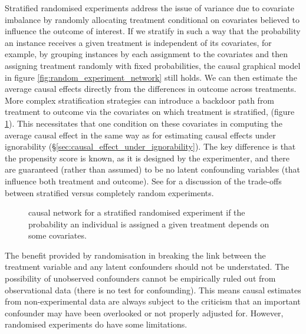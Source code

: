 \documentclass[11pt,a4paper,twoside]{report}
\theoremstyle{plain}
\theoremstyle{definition}
\begin{document}
Stratified randomised experiments address the issue of variance due to covariate imbalance by randomly allocating treatment conditional on covariates believed to influence the outcome of interest. If we stratify in such a way that the probability an instance receives a given treatment is independent of its covariates, for example, by grouping instances by each assignment to the covariates and then assigning treatment randomly with fixed probabilities, the causal graphical model in figure \ref{fig:random_experiment_network} still holds. We can then estimate the average causal effects directly from the differences in outcome across treatments. More complex stratification strategies can introduce a backdoor path from treatment to outcome via the covariates on which treatment is stratified, (figure \ref{fig:random_experiment_network_stratified}). This necessitates that one condition on these covariates in computing the average causal effect in the same way as for estimating causal effects under ignorability (\S\ref{sec:causal_effect_under_ignorability}). The key difference is that the propensity score is known, as it is designed by the experimenter, and there are guaranteed (rather than assumed) to be no latent confounding variables (that influence both treatment and outcome). See \citet{imbens2015causal} for a discussion of the trade-offs between stratified versus completely random experiments. 

\begin{figure}
\centering
{}
\caption{causal network for a stratified randomised experiment if the probability an individual is assigned a given treatment depends on some covariates.}
\label{fig:random_experiment_network_stratified}
\end{figure} 

The benefit provided by randomisation in breaking the link between the treatment variable and any latent confounders should not be understated. The possibility of unobserved confounders cannot be empirically ruled out from observational data \citep{Pearl2000} (there is no test for confounding). This means causal estimates from non-experimental data are always subject to the criticism that an important confounder may have been overlooked or not properly adjusted for. However, randomised experiments do have some limitations. 
\end{document}
